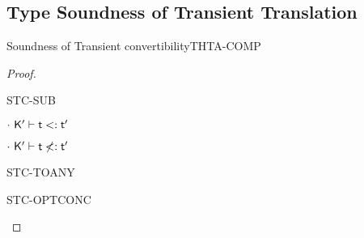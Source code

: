 \documentclass[acmlarge, anonymous, authordraft]{acmart}
\begin{document}
\subsection{Type Soundness of Transient Translation}

\begin{lemma}{Soundness of Transient convertibility}{THTA-COMP}
  \begin{conds}
    \cond{$\EnvTypeS\Env\K\e\t$}
    \cond{$\ep = \TRG{\e}\Env$}
    \cond{$\TR\K = \Kp$}
    \cond{$\TR\Env = \Envp$}
    \cond{$\EnvType\Envp\cdot\Kp{\ep}{\t}$}
  \end{conds}
  \then\axiom{$\EnvType\Envp\cdot\Kp{\TAG\e\Env{\tp}}{\kty\tp}$}

  \begin{proof}{ \indmsg{$\Convertible\K\t\tp$}}

  \begin{case}{STC-SUB}
    \begin{case}{$\StrSub\cdot\Kp{\t}{\tp}$}
    \end{case}

    \begin{case}{$\StrNotSub\cdot\Kp{\t}{\tp}$}
    \end{case}
  \end{case}

  \begin{case}{STC-TOANY}
  \end{case}

  \begin{case}{STC-OPTCONC}
  \end{case}

  \end{proof}
\end{lemma}
\end{document}

